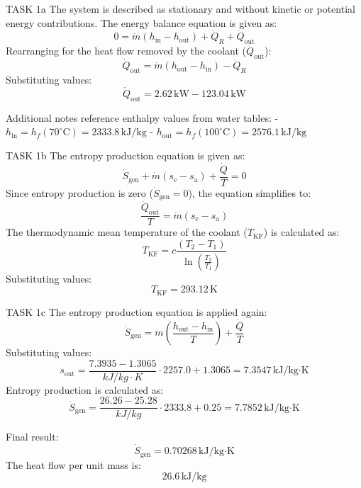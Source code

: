 TASK 1a  
The system is described as stationary and without kinetic or potential energy contributions. The energy balance equation is given as:  
\[
0 = \dot{m} (h_{\text{in}} - h_{\text{out}}) + \dot{Q}_R + \dot{Q}_{\text{out}}
\]  
Rearranging for the heat flow removed by the coolant (\( \dot{Q}_{\text{out}} \)):  
\[
\dot{Q}_{\text{out}} = \dot{m} (h_{\text{out}} - h_{\text{in}}) - \dot{Q}_R
\]  
Substituting values:  
\[
\dot{Q}_{\text{out}} = 2.62 \, \text{kW} - 123.04 \, \text{kW}
\]  

Additional notes reference enthalpy values from water tables:  
- \( h_{\text{in}} = h_{f}(70^\circ\text{C}) = 2333.8 \, \text{kJ/kg} \)  
- \( h_{\text{out}} = h_{f}(100^\circ\text{C}) = 2576.1 \, \text{kJ/kg} \)  

TASK 1b  
The entropy production equation is given as:  
\[
\dot{S}_{\text{gen}} + \dot{m} (s_{\text{e}} - s_{\text{a}}) + \frac{\dot{Q}}{T} = 0
\]  
Since entropy production is zero (\( \dot{S}_{\text{gen}} = 0 \)), the equation simplifies to:  
\[
\frac{\dot{Q}_{\text{out}}}{T} = \dot{m} (s_{\text{e}} - s_{\text{a}})
\]  
The thermodynamic mean temperature of the coolant (\( T_{\text{KF}} \)) is calculated as:  
\[
T_{\text{KF}} = c \frac{(T_2 - T_1)}{\ln \left( \frac{T_2}{T_1} \right)}
\]  
Substituting values:  
\[
T_{\text{KF}} = 293.12 \, \text{K}
\]  

TASK 1c  
The entropy production equation is applied again:  
\[
\dot{S}_{\text{gen}} = \dot{m} \left( \frac{h_{\text{out}} - h_{\text{in}}}{T} \right) + \frac{\dot{Q}}{T}
\]  
Substituting values:  
\[
s_{\text{out}} = \frac{7.3935 - 1.3065}{kJ/kg·K} \cdot 2257.0 + 1.3065 = 7.3547 \, \text{kJ/kg·K}
\]  
Entropy production is calculated as:  
\[
\dot{S}_{\text{gen}} = \frac{26.26 - 25.28}{kJ/kg} \cdot 2333.8 + 0.25 = 7.7852 \, \text{kJ/kg·K}
\]  

Final result:  
\[
\dot{S}_{\text{gen}} = 0.70268 \, \text{kJ/kg·K}
\]  
The heat flow per unit mass is:  
\[
26.6 \, \text{kJ/kg}
\]